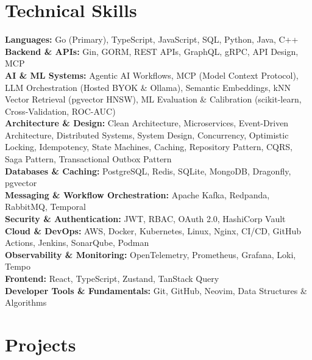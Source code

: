 \documentclass[10pt,a4paper]{article}
\begin{document}
\section*{Technical Skills}
\begin{flushleft}
\setlength{\parskip}{1.5pt}%
\textbf{Languages:} Go (Primary), TypeScript, JavaScript, SQL, Python, Java, C++\\
\textbf{Backend \& APIs:} Gin, GORM, REST APIs, GraphQL, gRPC, API Design, MCP\\
\textbf{AI \& ML Systems:} Agentic AI Workflows, MCP (Model Context Protocol), LLM Orchestration (Hosted BYOK \& Ollama), Semantic Embeddings, kNN Vector Retrieval (pgvector HNSW), ML Evaluation \& Calibration (scikit-learn, Cross-Validation, ROC-AUC)\\
\textbf{Architecture \& Design:} Clean Architecture, Microservices, Event-Driven Architecture, Distributed Systems, System Design, Concurrency, Optimistic Locking, Idempotency, State Machines, Caching, Repository Pattern, CQRS, Saga Pattern, Transactional Outbox Pattern\\
\textbf{Databases \& Caching:} PostgreSQL, Redis, SQLite, MongoDB, Dragonfly, pgvector\\
\textbf{Messaging \& Workflow Orchestration:} Apache Kafka, Redpanda, RabbitMQ, Temporal\\
\textbf{Security \& Authentication:} JWT, RBAC, OAuth 2.0, HashiCorp Vault\\
\textbf{Cloud \& DevOps:} AWS, Docker, Kubernetes, Linux, Nginx, CI/CD, GitHub Actions, Jenkins, SonarQube, Podman\\
\textbf{Observability \& Monitoring:} OpenTelemetry, Prometheus, Grafana, Loki, Tempo\\
\textbf{Frontend:} React, TypeScript, Zustand, TanStack Query\\
\textbf{Developer Tools \& Fundamentals:} Git, GitHub, Neovim, Data Structures \& Algorithms
\end{flushleft}

\section*{Projects}
\end{document}
